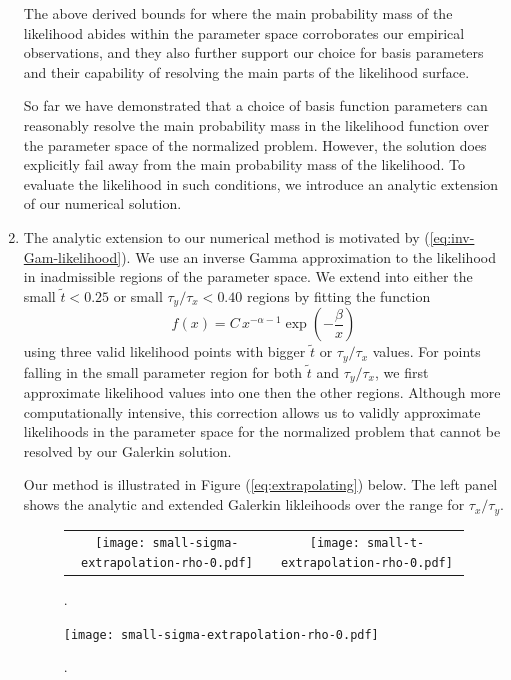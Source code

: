 \documentclass[10pt]{article}
\begin{document}
\begin{enumerate}
      The above derived bounds for where the main probability mass of
      the likelihood abides within the parameter space corroborates
      our empirical observations, and they also further support our
      choice for basis parameters and their capability of resolving
      the main parts of the likelihood surface.

      So far we have demonstrated that a choice of basis function
      parameters can reasonably resolve the main probability mass in
      the likelihood function over the parameter space of the
      normalized problem. However, the solution does explicitly fail
      away from the main probability mass of the likelihood. To
      evaluate the likelihood in such conditions, we introduce an
      analytic extension of our numerical solution.

    \item The analytic extension to our numerical method is motivated
      by (\ref{eq:inv-Gam-likelihood}). We use an inverse Gamma
      approximation to the likelihood in inadmissible regions of the
      parameter space. We extend into either the small $\tilde{t} < 0.25$ or
      small $\tau_y/\tau_x < 0.40$ regions by fitting the function
      \[
        f(x) = C\, x^{-\alpha-1} \exp\left( -\frac{\beta}{x} \right)
      \]
      using three valid likelihood points with bigger $\tilde{t}$ or
      $\tau_y/\tau_x$ values. For points falling in the small
      parameter region for both $\tilde{t}$ and $\tau_y/\tau_x$, we
      first approximate likelihood values into one then the other
      regions. Although more computationally intensive, this
      correction allows us to validly approximate likelihoods in the
      parameter space for the normalized problem that cannot be
      resolved by our Galerkin solution.

      Our method is illustrated in Figure (\ref{eq:extrapolating})
      below. The left panel shows the analytic and extended Galerkin
      likleihoods over the range for $\tau_x/\tau_y$.

      \begin{figure}
  \centering
  \begin{tabular}{cc}
    \begin{minipage}{0.45\textwidth}
      \centering
      \texttt{[image: small-sigma-extrapolation-rho-0.pdf]}
    \end{minipage}
    & \begin{minipage}{0.45\textwidth}
      \centering
      \texttt{[image: small-t-extrapolation-rho-0.pdf]}
    \end{minipage}
  \end{tabular}
  \caption{.}
  \label{fig:extrapolation}
\end{figure}
      \begin{figure}
        \centering
        \texttt{[image: small-sigma-extrapolation-rho-0.pdf]}
        \caption{.}
        \label{fig:extrapolation}
      \end{figure}

    \end{enumerate}
\end{document}

